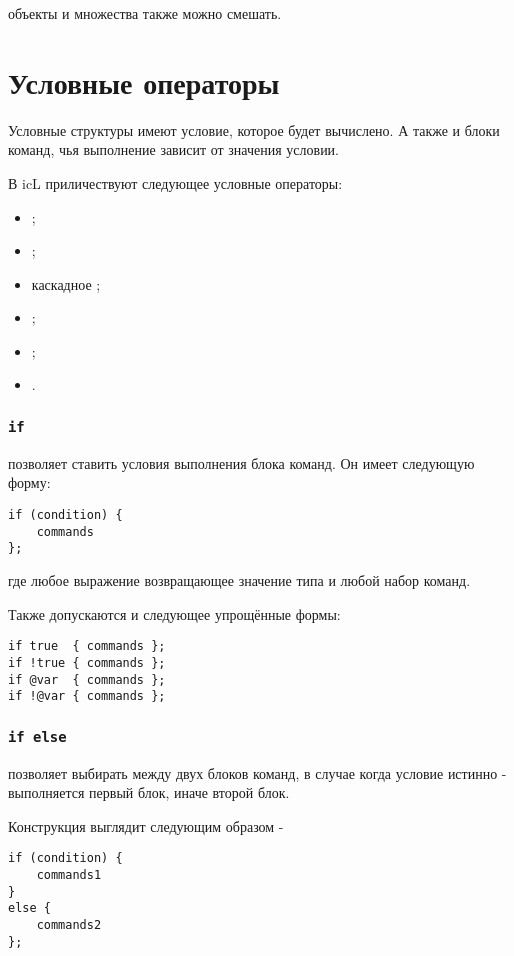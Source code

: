 \documentclass[a4paper, 14pt]{extarticle}
\newenvironment{icItems}
	{ \begin{itemize} [noitemsep,nolistsep] }
	{ \end{itemize} }
\begin{document}
 объекты и множества также можно смешать.

\newpage
\section{Условные операторы}

Условные структуры имеют условие, которое будет вычислено. А также и блоки команд, чья выполнение зависит от значения условии.

В icL приличествуют следующее условные операторы:
\begin{icItems}
	\item {};
	\item {};
	\item каскадное ;
	\item {};
	\item {};
	\item {}.
\end{icItems}

\subsubsection{\lstinline`if`}

 позволяет ставить условия выполнения блока команд. Он имеет следующую форму:
\begin{lstlisting}[numbers=none]
if (condition) {
	commands
};
\end{lstlisting}
где  любое выражение возвращающее значение типа \bool и  любой набор команд.

Также допускаются и следующее упрощённые формы:
\begin{lstlisting}
if true  { commands };
if !true { commands };
if @var  { commands };
if !@var { commands };
\end{lstlisting}

\subsubsection{\lstinline`if else`}

 позволяет выбирать между двух блоков команд, в случае когда условие истинно - выполняется первый блок, иначе второй блок.

\noindent Конструкция  выглядит следующим образом -
\begin{lstlisting}[numbers=none]
if (condition) {
	commands1
}
else {
	commands2
};
\end{lstlisting}
\end{document}

